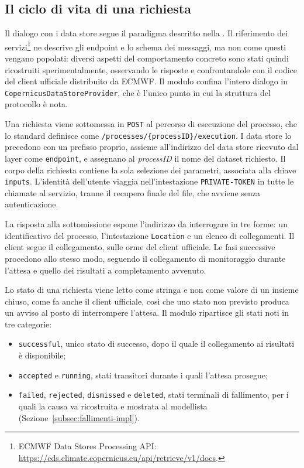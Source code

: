\subsection{Il ciclo di vita di una richiesta}
\label{subsec:ciclo-richiesta-impl}

Il dialogo con i data store segue il paradigma descritto nella .
Il riferimento dei servizi\footnote{ECMWF Data
Stores Processing API: \url{https://cds.climate.copernicus.eu/api/retrieve/v1/docs}.} ne
descrive gli endpoint e lo schema dei messaggi, ma non come questi vengano popolati: diversi
aspetti del comportamento concreto sono stati quindi ricostruiti sperimentalmente, osservando
le risposte e confrontandole con il codice del client ufficiale distribuito da
ECMWF. Il modulo confina l'intero dialogo in
\texttt{CopernicusDataStoreProvider}, che è l'unico punto in cui la struttura del protocollo
è nota.

Una richiesta viene sottomessa in \texttt{POST} al percorso di esecuzione del processo, che
lo standard definisce come \texttt{/processes/\{processID\}/execution}. I data store lo
precedono con un prefisso proprio, assieme all'indirizzo del data store
ricevuto dal layer come \texttt{endpoint}, e assegnano al \emph{processID} il nome del
dataset richiesto. Il corpo della richiesta contiene la sola selezione dei parametri,
associata alla chiave \texttt{inputs}. L'identità dell'utente viaggia nell'intestazione
\texttt{PRIVATE-TOKEN} in tutte le chiamate al servizio, tranne il recupero finale del file,
che avviene senza autenticazione.
 
La risposta alla sottomissione espone l'indirizzo da interrogare in tre forme: un
identificativo del processo, l'intestazione \texttt{Location} e un elenco di collegamenti.
Il client segue il collegamento, sulle orme del client ufficiale. Le fasi successive procedono
allo stesso modo, seguendo il collegamento di monitoraggio durante l'attesa e
quello dei risultati a completamento avvenuto.
 
Lo stato di una richiesta viene letto come stringa e non come valore di un insieme chiuso,
come fa anche il client ufficiale, così che uno stato non previsto produca un avviso
al posto di interrompere l'attesa. Il modulo ripartisce gli stati noti in tre categorie:

\begin{itemize}
    \item \texttt{successful}, unico stato di successo, dopo il quale il collegamento ai
    risultati è disponibile;
    \item \texttt{accepted} e \texttt{running}, stati transitori durante i quali l'attesa
    prosegue;
    \item \texttt{failed}, \texttt{rejected}, \texttt{dismissed} e \texttt{deleted}, stati
    terminali di fallimento, per i quali la causa va ricostruita e mostrata al modellista
    (Sezione~\ref{subsec:fallimenti-impl}).
\end{itemize}
 
